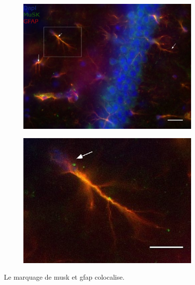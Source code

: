 \begin{figure}[h]
\begin{center}
\begin{subfigure}[h]{0.49\textwidth}
			\end{subfigure}
			\begin{subfigure}[h]{0.49\textwidth}
				\caption{}
				\label{fig:ColocMuSK&GFAP}
				\includegraphics[width=\textwidth]{./Images/Immuno/Musk/MuSK-GFAP/M439_Mut_MuSK_GFAP.jpg}
			\end{subfigure}
			\begin{subfigure}[h]{0.49\textwidth}
				\caption{}
				\label{fig:ColocZoom}
				\includegraphics[width=\textwidth]{./Images/Immuno/Musk/MuSK-GFAP/zoom10um.jpg}
			\end{subfigure}
		\end{center}
		\caption{Le marquage de \gls{musk} et \gls{gfap} colocalise.}
\end{figure}
